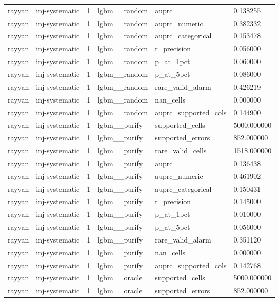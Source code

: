 \begin{tabular}{llllll}
rayyan & inj-systematic & 1 & lgbm\_\_random & auprc & 0.138255 \\
rayyan & inj-systematic & 1 & lgbm\_\_random & auprc\_numeric & 0.382332 \\
rayyan & inj-systematic & 1 & lgbm\_\_random & auprc\_categorical & 0.153478 \\
rayyan & inj-systematic & 1 & lgbm\_\_random & r\_precision & 0.056000 \\
rayyan & inj-systematic & 1 & lgbm\_\_random & p\_at\_1pct & 0.060000 \\
rayyan & inj-systematic & 1 & lgbm\_\_random & p\_at\_5pct & 0.086000 \\
rayyan & inj-systematic & 1 & lgbm\_\_random & rare\_valid\_alarm & 0.426219 \\
rayyan & inj-systematic & 1 & lgbm\_\_random & nan\_cells & 0.000000 \\
rayyan & inj-systematic & 1 & lgbm\_\_random & auprc\_supported\_cols & 0.144900 \\
rayyan & inj-systematic & 1 & lgbm\_\_purify & supported\_cells & 5000.000000 \\
rayyan & inj-systematic & 1 & lgbm\_\_purify & supported\_errors & 852.000000 \\
rayyan & inj-systematic & 1 & lgbm\_\_purify & rare\_valid\_cells & 1518.000000 \\
rayyan & inj-systematic & 1 & lgbm\_\_purify & auprc & 0.136438 \\
rayyan & inj-systematic & 1 & lgbm\_\_purify & auprc\_numeric & 0.461902 \\
rayyan & inj-systematic & 1 & lgbm\_\_purify & auprc\_categorical & 0.150431 \\
rayyan & inj-systematic & 1 & lgbm\_\_purify & r\_precision & 0.145000 \\
rayyan & inj-systematic & 1 & lgbm\_\_purify & p\_at\_1pct & 0.010000 \\
rayyan & inj-systematic & 1 & lgbm\_\_purify & p\_at\_5pct & 0.056000 \\
rayyan & inj-systematic & 1 & lgbm\_\_purify & rare\_valid\_alarm & 0.351120 \\
rayyan & inj-systematic & 1 & lgbm\_\_purify & nan\_cells & 0.000000 \\
rayyan & inj-systematic & 1 & lgbm\_\_purify & auprc\_supported\_cols & 0.142768 \\
rayyan & inj-systematic & 1 & lgbm\_\_oracle & supported\_cells & 5000.000000 \\
rayyan & inj-systematic & 1 & lgbm\_\_oracle & supported\_errors & 852.000000 \\

\end{tabular}
